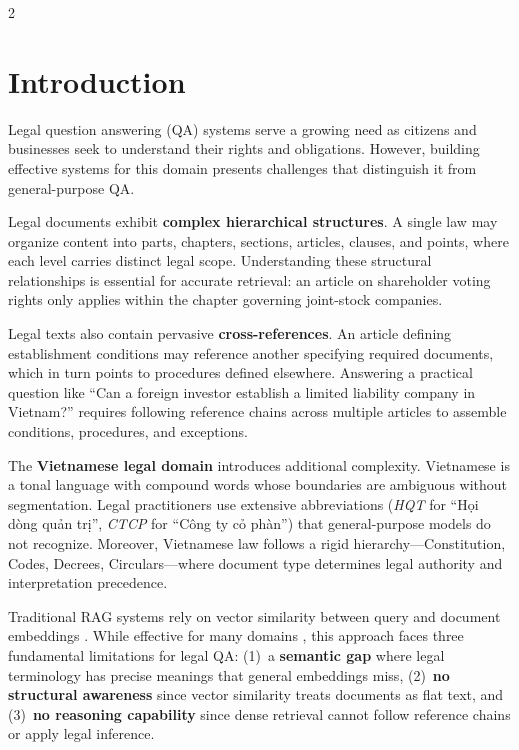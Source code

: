\documentclass[11pt,a4paper]{article}
\begin{document}
\begin{multicols}{2}

\section{Introduction}

Legal question answering (QA) systems serve a growing need as citizens and businesses seek to understand their rights and obligations. However, building effective systems for this domain presents challenges that distinguish it from general-purpose QA.

Legal documents exhibit \textbf{complex hierarchical structures}. A single law may organize content into parts, chapters, sections, articles, clauses, and points, where each level carries distinct legal scope. Understanding these structural relationships is essential for accurate retrieval: an article on shareholder voting rights only applies within the chapter governing joint-stock companies.

Legal texts also contain pervasive \textbf{cross-references}. An article defining establishment conditions may reference another specifying required documents, which in turn points to procedures defined elsewhere. Answering a practical question like ``Can a foreign investor establish a limited liability company in Vietnam?'' requires following reference chains across multiple articles to assemble conditions, procedures, and exceptions.

The \textbf{Vietnamese legal domain} introduces additional complexity. Vietnamese is a tonal language with compound words whose boundaries are ambiguous without segmentation. Legal practitioners use extensive abbreviations (\textit{H\DJ QT} for ``H\d{o}i d\`{o}ng qu\h{a}n tr\d{i}'', \textit{CTCP} for ``C\^{o}ng ty c\h{o} ph\`{a}n'') that general-purpose models do not recognize. Moreover, Vietnamese law follows a rigid hierarchy---Constitution, Codes, Decrees, Circulars---where document type determines legal authority and interpretation precedence.

Traditional RAG systems \cite{ref2} rely on vector similarity between query and document embeddings \cite{ref_sbert}. While effective for many domains \cite{ref_gao2024,ref_fan2024}, this approach faces three fundamental limitations for legal QA: (1)~a \textbf{semantic gap} where legal terminology has precise meanings that general embeddings miss, (2)~\textbf{no structural awareness} since vector similarity treats documents as flat text, and (3)~\textbf{no reasoning capability} since dense retrieval cannot follow reference chains or apply legal inference.


\end{multicols}
\end{document}
